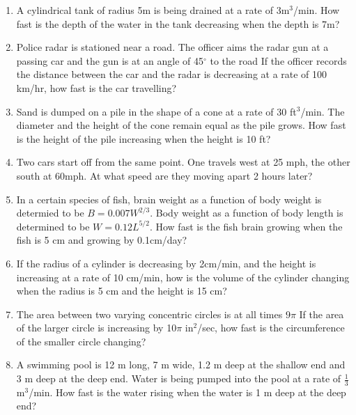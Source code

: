 \documentclass[11pt]{article}
\begin{document}
\begin{enumerate}
  \item{A cylindrical tank of radius 5m is being drained at a rate of 3m$^3$/min.  How fast is the depth of the water in the tank decreasing
  when the depth is 7m?}
  

\item{Police radar is stationed near a road.  The officer aims the radar gun at a passing car and the gun is at an angle of 45$^{\circ}$ to the road
  If the officer records the distance between the car and the radar is decreasing at a rate of 100 km/hr, how fast is the car travelling?
}

\item{Sand is dumped on a pile in the shape of a cone at a rate of 30 ft$^3$/min.  The diameter and the height of the cone remain equal as the pile
  grows.  How fast is the height of the pile increasing when the height is 10 ft?
}

\item{Two cars start off from the same point.  One travels west at 25 mph, the other south at 60mph.  At what speed are they moving apart 2 hours later?
}
\item{In a certain species of fish, brain weight as a function of body weight is determied to be $B=0.007W^{2/3}$.  Body weight as a function of body length is determined to be $W=0.12L^{5/2}$.  How fast is the fish brain growing when the fish is 5 cm and growing by 0.1cm/day?
}

\item{If the radius of a cylinder is decreasing by 2cm/min, and the height is increasing at a rate of 10 cm/min, how is the volume of the cylinder changing when the radius is 5 cm and the height is 15 cm?}

\item{The area between two varying concentric circles is at all times $9\pi$ If the area of the larger circle is increasing by 10$\pi$ in$^2$/sec, how
fast is the circumference of the smaller circle changing?}

\item{A swimming pool is 12 m long, 7 m wide, 1.2 m deep at the shallow end and 3 m deep at the deep end.  Water is being pumped into the pool
at a rate of $\frac13$m$^3$/min.  How fast is the water rising when the water is 1 m deep at the deep end?}

\end{enumerate}

\vspace{1in}
\end{document}
